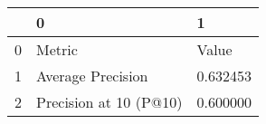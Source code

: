 \begin{tabular}{lll}
\toprule
 & 0 & 1 \\
\midrule
0 & Metric & Value \\
1 & Average Precision & 0.632453 \\
2 & Precision at 10 (P@10) & 0.600000 \\
\bottomrule
\end{tabular}
